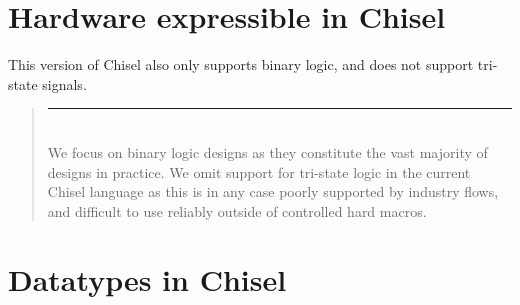 \documentclass[twocolumn,10pt]{article}
\newenvironment{commentary}
{ \vspace{-0.1in}
  \begin{quotation}
  \noindent
  \small \em
  \rule{\linewidth}{1pt}\\
}
{
  \end{quotation}
}
\begin{document}
\section{Hardware expressible in Chisel}

% 

This version of Chisel also only supports binary logic, and does not
support tri-state signals.
\begin{commentary}
We focus on binary logic designs as they constitute the vast majority
of designs in practice.  We omit support for tri-state logic in the
current Chisel language as this is in any case poorly supported by
industry flows, and difficult to use reliably outside of controlled
hard macros.
\end{commentary}

\section{Datatypes in Chisel}
\end{document}
